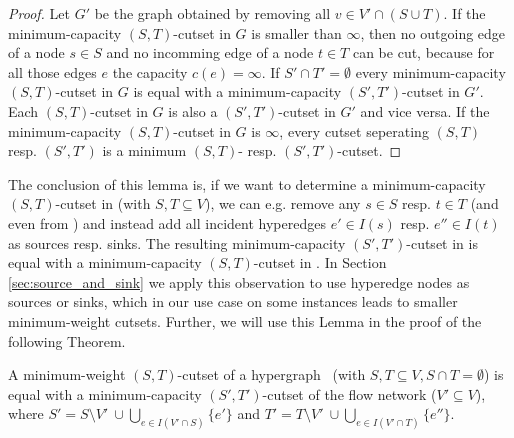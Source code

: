 \begin{proof}
Let $G'$ be the graph obtained by removing all $v \in V' \cap (S \cup T)$. If
the minimum-capacity $(S,T)$-cutset in $G$ is smaller than $\infty$, then no outgoing
edge of a node $s \in S$ and no incomming edge of a node $t \in T$ can be cut, because for all
those edges $e$ the capacity $c(e) = \infty$. If $S' \cap T' = \emptyset$ every
minimum-capacity $(S,T)$-cutset in $G$ is equal with a minimum-capacity $(S',T')$-cutset
in $G'$. 
Each $(S,T)$-cutset in $G$ is also a $(S',T')$-cutset in $G'$ and vice versa.
If the minimum-capacity $(S,T)$-cutset in $G$ is $\infty$, every cutset seperating
$(S,T)$ resp. $(S',T')$ is a minimum $(S,T)$- resp. $(S',T')$-cutset.
\end{proof}

The conclusion of this lemma is, if we want to determine a minimum-capacity $(S,T)$-cutset
in  (with $S,T \subseteq V$), we can e.g. remove any $s \in S$ resp. $t \in T$ 
(and even from ) and instead add all incident 
hyperedges $e' \in I(s)$ resp. $e'' \in I(t)$ as sources resp. sinks. The resulting 
minimum-capacity $(S',T')$-cutset in  is equal with a minimum-capacity $(S,T)$-cutset
in . In Section \ref{sec:source_and_sink} we apply this observation to
use hyperedge nodes as sources or sinks, which in our use case on some instances
leads to smaller minimum-weight cutsets. Further, we will use this Lemma in the
proof of the following Theorem.

\begin{theorem}
\label{theorem:st_cutset_equal}
A minimum-weight $(S,T)$-cutset of a hypergraph \HypergraphDef~(with $S,T \subseteq V,
S \cap T = \emptyset$) is equal with a minimum-capacity $(S',T')$-cutset of the
flow network  ($V' \subseteq V$), where $S' = S \setminus V'\ \cup \bigcup\limits_{e \in I(V' \cap S)} \{e'\}$ and 
$T' = T \setminus V'\ \cup \bigcup\limits_{e \in I(V'\cap T)} \{e''\}$.
\label{theorem:heuer_network}
\end{theorem}

